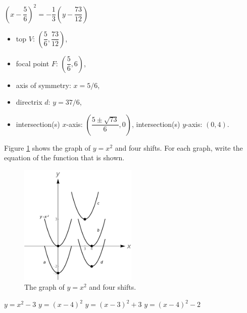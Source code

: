 \begin{Answer}
	\Question $\left( x- \dfrac{5}{6} \right)^2 = -\dfrac{1}{3}\left( y -  \dfrac{73}{12} \right) $
	    \begin{itemize}
	    \item top $V$: $\left(\dfrac{5}{6}, \dfrac{73}{12} \right)$,
	    \item focal point $F$: $\left(\dfrac{5}{6}, 6 \right)$, 
	    \item axis of symmetry: $x=5/6$,
	    \item directrix $d$: $y=37/6$,
	    \item intersection(s) $x$-axis: $\left(\dfrac{5 \pm \sqrt{73}}{6},0 \right)$, \; intersection(s) $y$-axis: $(0,4)$.
	    \end{itemize}
\end{Answer}


\begin{Exercise}[difficulty = 1] Figure \ref{fig_algebraic_36} shows the graph of $y=x^2$ and four shifts. For each graph, write the equation of the function that is shown. 
		\begin{figure}[H]
		\begin{center}
			\includegraphics[width=0.5\textwidth]{fig_algebraic_36}
			\caption{The graph of $y=x^2$ and four shifts.}
			\label{fig_algebraic_36}
		\end{center}
		\end{figure}

\end{Exercise}

\begin{Answer}\phantom{}
    \begin{multicols}{2}
    
    	\Question $y = x^2 - 3$
    	\Question $y = (x - 4)^2$
    	\Question $y = (x - 3)^2 + 3$
    	\Question $y = (x - 4)^2 - 2$
    \EndCurrentQuestion
    \end{multicols}
\end{Answer}


